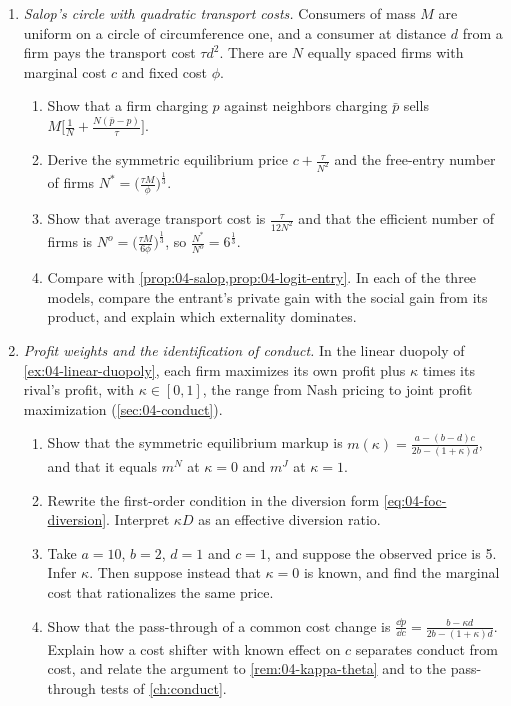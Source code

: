 \begin{enumerate}[label=\arabic*., leftmargin=*, itemsep=6pt]
\item \textit{Salop's circle with quadratic transport costs.} Consumers of mass $M$ are uniform on a circle of
circumference one, and a consumer at distance $d$ from a firm pays the transport cost $\tau d^2$. There are $N$
equally spaced firms with marginal cost $c$ and fixed cost $\phi$.
\begin{enumerate}[label=(\alph*)]
  \item Show that a firm charging $p$ against neighbors charging $\bar p$ sells
  $M\big[\frac{1}{N} + \frac{N(\bar p - p)}{\tau}\big]$.
  \item Derive the symmetric equilibrium price $c + \frac{\tau}{N^2}$ and the free-entry number of firms
  $N^* = \big(\frac{\tau M}{\phi}\big)^{\frac{1}{3}}$.
  \item Show that average transport cost is $\frac{\tau}{12N^2}$ and that the efficient number of firms is
  $N^o = \big(\frac{\tau M}{6\phi}\big)^{\frac{1}{3}}$, so $\frac{N^*}{N^o} = 6^{\frac{1}{3}}$.
  \item Compare with \cref{prop:04-salop,prop:04-logit-entry}. In each of the three models, compare the entrant's
  private gain with the social gain from its product, and explain which externality dominates.
\end{enumerate}

\item \textit{Profit weights and the identification of conduct.} In the linear duopoly of
\cref{ex:04-linear-duopoly}, each firm maximizes its own profit plus $\kappa$ times its rival's profit, with
$\kappa \in [0, 1]$, the range from Nash pricing to joint profit maximization (\cref{sec:04-conduct}).
\begin{enumerate}[label=(\alph*)]
  \item Show that the symmetric equilibrium markup is $m(\kappa) = \frac{a - (b - d)c}{2b - (1 + \kappa)d}$, and that
  it equals $m^N$ at $\kappa = 0$ and $m^J$ at $\kappa = 1$.
  \item Rewrite the first-order condition in the diversion form \eqref{eq:04-foc-diversion}. Interpret $\kappa D$ as
  an effective diversion ratio.
  \item Take $a = 10$, $b = 2$, $d = 1$ and $c = 1$, and suppose the observed price is 5. Infer $\kappa$. Then
  suppose instead that $\kappa = 0$ is known, and find the marginal cost that rationalizes the same price.
  \item Show that the pass-through of a common cost change is
  $\frac{\dd p}{\dd c} = \frac{b - \kappa d}{2b - (1 + \kappa)d}$. Explain how a cost shifter with known effect on
  $c$ separates conduct from cost, and relate the argument to \cref{rem:04-kappa-theta} and to the pass-through tests
  of \cref{ch:conduct}.
\end{enumerate}


\end{enumerate}
